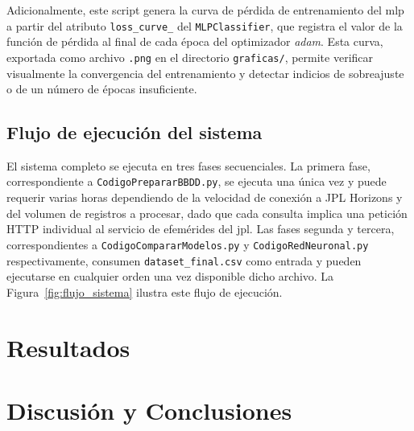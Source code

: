 \documentclass[12pt]{report} %
\begin{document}
Adicionalmente, este script genera la curva de pérdida de entrenamiento del \gls{mlp} a partir del atributo \texttt{loss\_curve\_} del \texttt{MLPClassifier}, que registra el valor de la función de pérdida al final de cada época del optimizador \textit{adam}. Esta curva, exportada como archivo \texttt{.png} en el directorio \texttt{graficas/}, permite verificar visualmente la convergencia del entrenamiento y detectar indicios de sobreajuste o de un número de épocas insuficiente.
 
\section{Flujo de ejecución del sistema}
 
El sistema completo se ejecuta en tres fases secuenciales. La primera fase, correspondiente a \texttt{CodigoPrepararBBDD.py}, se ejecuta una única vez y puede requerir varias horas dependiendo de la velocidad de conexión a JPL Horizons y del volumen de registros a procesar, dado que cada consulta implica una petición HTTP individual al servicio de efemérides del \gls{jpl}. Las fases segunda y tercera, correspondientes a \texttt{CodigoCompararModelos.py} y \texttt{CodigoRedNeuronal.py} respectivamente, consumen \texttt{dataset\_final.csv} como entrada y pueden ejecutarse en cualquier orden una vez disponible dicho archivo. La Figura~\ref{fig:flujo_sistema} ilustra este flujo de ejecución.
 


\chapter{Resultados}       

\chapter{Discusión y Conclusiones} 
\end{document}
